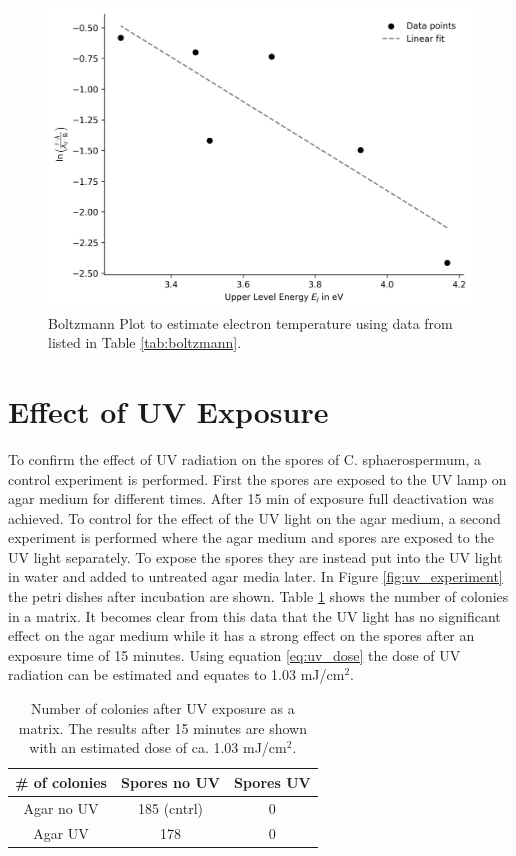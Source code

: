 \begin{figure}
    \centering
    \includegraphics[width=.85\textwidth]{images/boltzmann_plot.png}
    \caption[Boltzmann Plot to estimate electron temperature]{Boltzmann Plot to estimate electron temperature using data from \cite{coefficients} listed in Table \ref{tab:boltzmann}.}
    \label{fig:boltzmann}
\end{figure}

\section{Effect of UV Exposure}
To confirm the effect of UV radiation on the spores of C. sphaerospermum, a control experiment is performed. First the spores are exposed to the UV lamp on agar medium for different times. After 15 min of exposure full deactivation was achieved. To control for the effect of the UV light on the agar medium, a second experiment is performed where the agar medium and spores are exposed to the UV light separately. To expose the spores they are instead put into the UV light in water and added to untreated agar media later. In Figure \ref{fig:uv_experiment} the petri dishes after incubation are shown. Table \ref{tab:uv_matrix} shows the number of colonies in a matrix. It becomes clear from this data that the UV light has no significant effect on the agar medium while it has a strong effect on the spores after an exposure time of 15 minutes. Using equation \ref{eq:uv_dose} the dose of UV radiation can be estimated and equates to 1.03 mJ/cm$^2$.

\begin{table}
    \centering
    \caption[Number of colonies after UV exposure as a matrix]{Number of colonies after UV exposure as a matrix. The results after 15 minutes are shown with an estimated dose of ca. 1.03 mJ/cm$^2$.}
    \vspace*{1em}
    \renewcommand{\arraystretch}{1.4}
    \setlength{\tabcolsep}{12pt}
    \begin{tabular}{c|cc}
        {\# of colonies} & {Spores no UV} & {Spores UV} \\
        \hline
        Agar no UV & 185 (cntrl) & 0 \\
        Agar UV    & 178 & 0 \\
    \end{tabular}
    \label{tab:uv_matrix}
\end{table}


